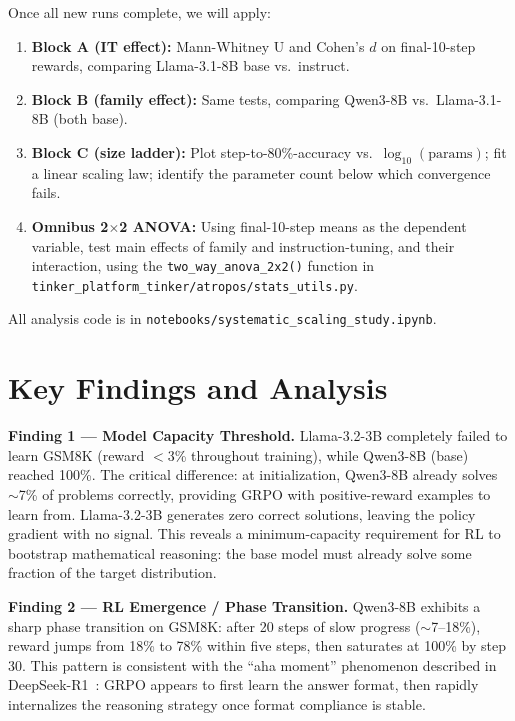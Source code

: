 \documentclass[12pt,a4paper]{report}
\theoremstyle{definition}
\begin{document}
Once all new runs complete, we will apply:
\begin{enumerate}
    \item \textbf{Block A (IT effect):} Mann-Whitney U and Cohen's $d$ on final-10-step rewards, comparing Llama-3.1-8B base vs.\ instruct.
    \item \textbf{Block B (family effect):} Same tests, comparing Qwen3-8B vs.\ Llama-3.1-8B (both base).
    \item \textbf{Block C (size ladder):} Plot step-to-80\%-accuracy vs.\ $\log_{10}(\text{params})$; fit a linear scaling law; identify the parameter count below which convergence fails.
    \item \textbf{Omnibus 2$\times$2 ANOVA:} Using final-10-step means as the dependent variable, test main effects of family and instruction-tuning, and their interaction, using the \texttt{two\_way\_anova\_2x2()} function in \texttt{tinker\_platform_tinker/atropos/stats\_utils.py}.
\end{enumerate}

All analysis code is in \texttt{notebooks/systematic\_scaling\_study.ipynb}.

\section{Key Findings and Analysis}
\label{sec:key_findings}

\textbf{Finding 1 --- Model Capacity Threshold.}
Llama-3.2-3B completely failed to learn GSM8K (reward $<$3\% throughout training), while Qwen3-8B (base) reached 100\%. The critical difference: at initialization, Qwen3-8B already solves $\sim$7\% of problems correctly, providing GRPO with positive-reward examples to learn from. Llama-3.2-3B generates zero correct solutions, leaving the policy gradient with no signal. This reveals a minimum-capacity requirement for RL to bootstrap mathematical reasoning: the base model must already solve some fraction of the target distribution.

\textbf{Finding 2 --- RL Emergence / Phase Transition.}
Qwen3-8B exhibits a sharp phase transition on GSM8K: after 20 steps of slow progress ($\sim$7--18\%), reward jumps from 18\% to 78\% within five steps, then saturates at 100\% by step 30. This pattern is consistent with the ``aha moment'' phenomenon described in DeepSeek-R1~\cite{deepseek2025r1}: GRPO appears to first learn the answer format, then rapidly internalizes the reasoning strategy once format compliance is stable.
\end{document}
